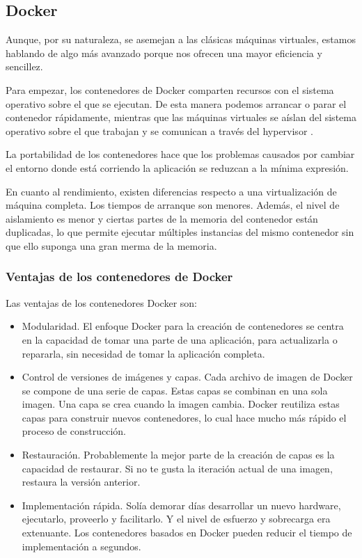 \subsection{Docker}

Aunque, por su naturaleza, se asemejan a las clásicas máquinas virtuales, estamos hablando de algo más avanzado porque nos ofrecen una mayor eficiencia y sencillez.

Para empezar, los contenedores de Docker comparten recursos con el sistema operativo sobre el que se ejecutan. De esta manera podemos arrancar o parar el contenedor rápidamente, mientras que las máquinas virtuales se aíslan del sistema operativo sobre el que trabajan y se comunican a través del hypervisor \cite{docker2}.

La portabilidad de los contenedores hace que los problemas causados por cambiar el entorno donde está corriendo la aplicación se reduzcan a la mínima expresión.

En cuanto al rendimiento, existen diferencias respecto a una virtualización de máquina completa. Los tiempos de arranque son menores. Además, el nivel de aislamiento es menor y ciertas partes de la memoria del contenedor están duplicadas, lo que permite ejecutar múltiples instancias del mismo contenedor sin que ello suponga una gran merma de la memoria.

\subsubsection{Ventajas de los contenedores de Docker}

Las ventajas de los contenedores Docker son:

\begin{itemize}
  \item Modularidad. El enfoque Docker para la creación de contenedores se centra en la capacidad de tomar una parte de una aplicación, para actualizarla o repararla, sin necesidad de tomar la aplicación completa.
  \item Control de versiones de imágenes y capas. Cada archivo de imagen de Docker se compone de una serie de capas. Estas capas se combinan en una sola imagen. Una capa se crea cuando la imagen cambia. Docker reutiliza estas capas para construir nuevos contenedores, lo cual hace mucho más rápido el proceso de construcción.
  \item Restauración. Probablemente la mejor parte de la creación de capas es la capacidad de restaurar. Si no te gusta la iteración actual de una imagen, restaura la versión anterior.
  \item Implementación rápida. Solía demorar días desarrollar un nuevo hardware, ejecutarlo, proveerlo y facilitarlo. Y el nivel de esfuerzo y sobrecarga era extenuante. Los contenedores basados en Docker pueden reducir el tiempo de implementación a segundos.
\end{itemize}

